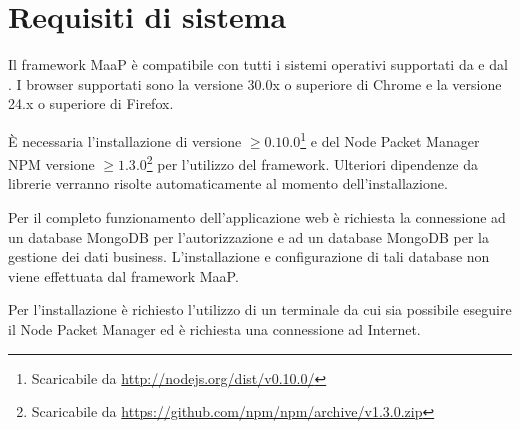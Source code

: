 \section{Requisiti di sistema}

Il framework MaaP è compatibile con tutti i sistemi operativi supportati da  e dal . I browser supportati sono la versione 30.0x o superiore di Chrome e la versione 24.x o superiore di Firefox.

È necessaria l'installazione di  versione $\geq 0.10.0$\footnote{Scaricabile da \url{http://nodejs.org/dist/v0.10.0/}} e del Node Packet Manager NPM versione $\geq 1.3.0$\footnote{Scaricabile da \url{https://github.com/npm/npm/archive/v1.3.0.zip}} per l'utilizzo del framework. Ulteriori dipendenze da librerie verranno risolte automaticamente al momento dell'installazione.

Per il completo funzionamento dell'applicazione web è richiesta la connessione ad un database MongoDB per l'autorizzazione e ad un database MongoDB per la gestione dei dati business. L'installazione e configurazione di tali database non viene effettuata dal framework MaaP.

Per l'installazione è richiesto l'utilizzo di un terminale da cui sia possibile eseguire il Node Packet Manager ed è richiesta una connessione ad Internet.
